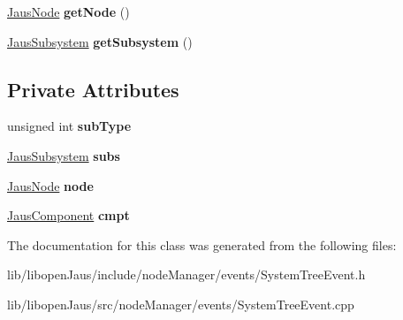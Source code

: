 \begin{DoxyCompactItemize}
\item 
\hypertarget{class_system_tree_event_a671f752bc7dc164cc9a2f9d913527c0a}{\hyperlink{struct_jaus_node_struct}{\-Jaus\-Node} {\bfseries get\-Node} ()}\label{class_system_tree_event_a671f752bc7dc164cc9a2f9d913527c0a}

\item 
\hypertarget{class_system_tree_event_ab3e6985e757ff742c9d6a93a2095ffda}{\hyperlink{struct_jaus_subsystem_struct}{\-Jaus\-Subsystem} {\bfseries get\-Subsystem} ()}\label{class_system_tree_event_ab3e6985e757ff742c9d6a93a2095ffda}

\end{DoxyCompactItemize}
\subsection*{\-Private \-Attributes}
\begin{DoxyCompactItemize}
\item 
\hypertarget{class_system_tree_event_ae943187127231cf61877e32bc04ea275}{unsigned int {\bfseries sub\-Type}}\label{class_system_tree_event_ae943187127231cf61877e32bc04ea275}

\item 
\hypertarget{class_system_tree_event_a1e1004e31d11b299bc2e84ae9fea1ee3}{\hyperlink{struct_jaus_subsystem_struct}{\-Jaus\-Subsystem} {\bfseries subs}}\label{class_system_tree_event_a1e1004e31d11b299bc2e84ae9fea1ee3}

\item 
\hypertarget{class_system_tree_event_a1aa28542e10e7865d672d4a660fac8ee}{\hyperlink{struct_jaus_node_struct}{\-Jaus\-Node} {\bfseries node}}\label{class_system_tree_event_a1aa28542e10e7865d672d4a660fac8ee}

\item 
\hypertarget{class_system_tree_event_a18b60e26d794e7a995f6d39d3278c8fe}{\hyperlink{struct_jaus_component_struct}{\-Jaus\-Component} {\bfseries cmpt}}\label{class_system_tree_event_a18b60e26d794e7a995f6d39d3278c8fe}

\end{DoxyCompactItemize}


\-The documentation for this class was generated from the following files\-:\begin{DoxyCompactItemize}
\item 
lib/libopen\-Jaus/include/node\-Manager/events/\-System\-Tree\-Event.\-h\item 
lib/libopen\-Jaus/src/node\-Manager/events/\-System\-Tree\-Event.\-cpp\end{DoxyCompactItemize}
